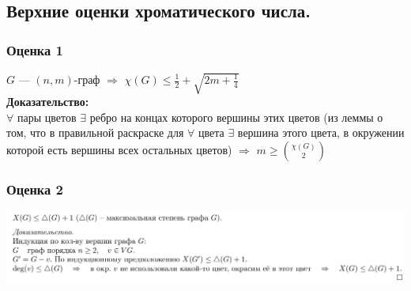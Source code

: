 \documentclass[12pt]{article}
\begin{document}
\subsection{Верхние оценки хроматического числа.}
\subsubsection{Оценка 1}
	$G$ — $(n,m)$-граф $\Rightarrow$ $\chi(G) \leqslant \frac{1}{2} + \sqrt{2m + \frac{1}{4}}$\\
	\textbf{Доказательство:}\\
		$\forall$ пары цветов $\exists$ ребро на концах которого вершины этих цветов (из леммы о том, что в правильной раскраске для $\forall$ цвета $\exists$ вершина этого цвета, в окружении которой есть вершины всех остальных цветов)	
		$\Rightarrow$ $m \geqslant \binom{\chi(G)}{2}$\\
	\qedsymbol
\subsubsection{Оценка 2}
	\includegraphics[width=550pt]{8}
\end{document}
